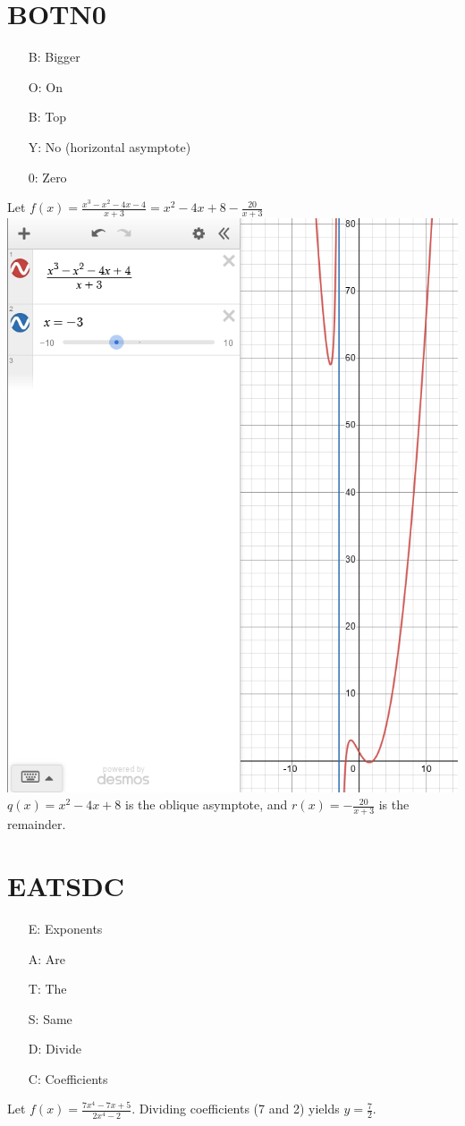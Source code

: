 \documentclass[11pt]{article}
\begin{document}
\section{BOTN0}
\begin{enumerate}[]
    \item[B:] Bigger
    \item[O:] On
    \item[B:] Top
    \item[Y:] No (horizontal asymptote)
    \item[0:] Zero
\end{enumerate}
Let $f(x)=\frac{x^3-x^2-4x-4}{x+3}=x^2-4x+8-\frac{20}{x+3}$\\
\includegraphics[scale=0.25]{botno.png}\\
$q(x)=x^2-4x+8$ is the oblique asymptote, and $r(x)=-\frac{20}{x+3}$ is the remainder.

\section{EATSDC}
\begin{enumerate}[]
    \item[E:] Exponents
    \item[A:] Are
    \item[T:] The
    \item[S:] Same
    \item[D:] Divide
    \item[C:] Coefficients
\end{enumerate}
Let $f(x)=\frac{7x^4-7x+5}{2x^4-2}$.
Dividing coefficients (7 and 2) yields $y=\frac{7}{2}$.
\end{document}
